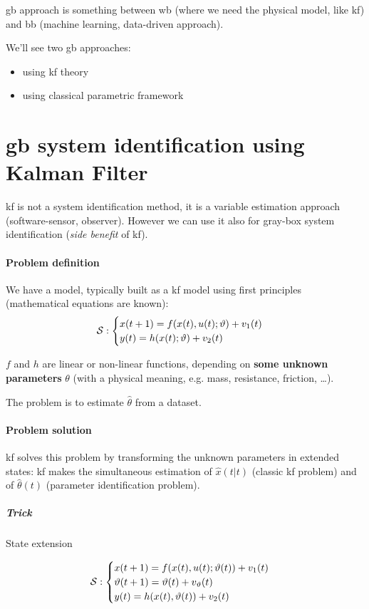 
\acrfull{gb} approach is something between \acrlong{wb} (where we need the physical model, like \gls{kf}) and \acrlong{bb} (machine learning, data-driven approach).

We'll see two \gls{gb} approaches:
\begin{itemize}
    \item using \gls{kf} theory
    \item using classical parametric framework
\end{itemize}

\section{\gls{gb} system identification using Kalman Filter}
\acrlong{kf} is not a system identification method, it is a variable estimation approach (software-sensor, observer).
However we can use it also for gray-box system identification (\emph{side benefit} of \gls{kf}).

\paragraph{Problem definition} We have a model, typically built as a \gls{kf} model using first principles (mathematical equations are known):
\[
    \mathcal{S}: \begin{cases}
        x(t+1) = f(x(t), u(t); \vartheta) + v_1(t) \\
        y(t) = h(x(t); \vartheta) + v_2(t)
    \end{cases}
\]

$f$ and $h$ are linear or non-linear functions, depending on \textbf{some unknown parameters} $\theta$ (with a physical meaning, e.g. mass, resistance, friction, \dots).

The problem is to estimate $\hat{\theta}$ from a dataset.

\paragraph{Problem solution}

\gls{kf} solves this problem by transforming the unknown parameters in extended states: \gls{kf} makes the simultaneous estimation of $\hat{x}(t|t)$ (classic \gls{kf} problem) and of $\hat{\theta}(t)$ (parameter identification problem).

\subparagraph{Trick} State extension

\[
    \mathcal{S}: \begin{cases}
        x(t+1) = f(x(t), u(t); \vartheta(t)) + v_1(t) \\
        \vartheta(t+1) = \vartheta(t) + v_\vartheta(t) \\
        y(t) = h(x(t), \vartheta(t)) + v_2(t)
    \end{cases}
\]

